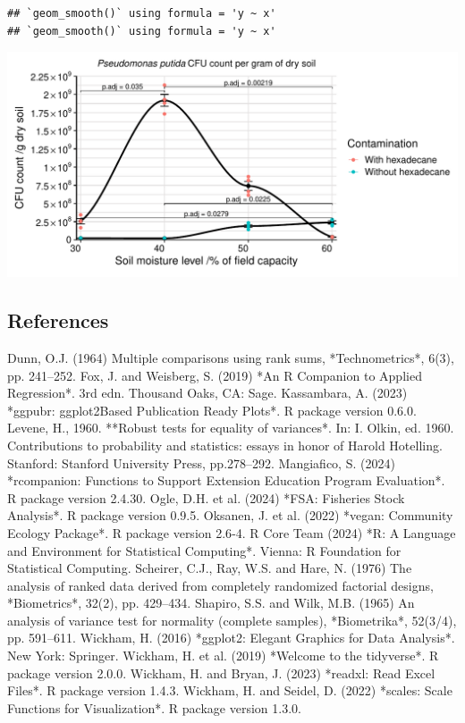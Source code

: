 \documentclass[
]{article}
\newenvironment{Shaded}{\begin{snugshade}}{\end{snugshade}}
\newcommand{\NormalTok}[1]{#1}
\begin{document}
\begin{verbatim}
## `geom_smooth()` using formula = 'y ~ x'
## `geom_smooth()` using formula = 'y ~ x'
\end{verbatim}

\includegraphics{analysis_files/figure-latex/visualise-group3-1.pdf}

\subsection{References}\label{references}

\begin{Shaded}
\begin{Highlighting}[]
\NormalTok{Dunn, O.J. (1964) \textquotesingle{}Multiple comparisons using rank sums\textquotesingle{}, *Technometrics*, 6(3), pp. 241–252.  }
\NormalTok{Fox, J. and Weisberg, S. (2019) *An R Companion to Applied Regression*. 3rd edn. Thousand Oaks, CA: Sage.  }
\NormalTok{Kassambara, A. (2023) *ggpubr: \textquotesingle{}ggplot2\textquotesingle{}{-}Based Publication Ready Plots*. R package version 0.6.0.  }
\NormalTok{Levene, H., 1960. **Robust tests for equality of variances*. In: I. Olkin, ed. 1960. Contributions to probability and statistics: essays in honor of Harold Hotelling. Stanford: Stanford University Press, pp.278–292.}
\NormalTok{Mangiafico, S. (2024) *rcompanion: Functions to Support Extension Education Program Evaluation*. R package version 2.4.30.  }
\NormalTok{Ogle, D.H. et al. (2024) *FSA: Fisheries Stock Analysis*. R package version 0.9.5.  }
\NormalTok{Oksanen, J. et al. (2022) *vegan: Community Ecology Package*. R package version 2.6{-}4.  }
\NormalTok{R Core Team (2024) *R: A Language and Environment for Statistical Computing*. Vienna: R Foundation for Statistical Computing.  }
\NormalTok{Scheirer, C.J., Ray, W.S. and Hare, N. (1976) \textquotesingle{}The analysis of ranked data derived from completely randomized factorial designs\textquotesingle{}, *Biometrics*, 32(2), pp. 429–434.  }
\NormalTok{Shapiro, S.S. and Wilk, M.B. (1965) \textquotesingle{}An analysis of variance test for normality (complete samples)\textquotesingle{}, *Biometrika*, 52(3/4), pp. 591–611.   }
\NormalTok{Wickham, H. (2016) *ggplot2: Elegant Graphics for Data Analysis*. New York: Springer.  }
\NormalTok{Wickham, H. et al. (2019) *Welcome to the tidyverse*. R package version 2.0.0.  }
\NormalTok{Wickham, H. and Bryan, J. (2023) *readxl: Read Excel Files*. R package version 1.4.3.  }
\NormalTok{Wickham, H. and Seidel, D. (2022) *scales: Scale Functions for Visualization*. R package version 1.3.0.}
\end{Highlighting}
\end{Shaded}
\end{document}
